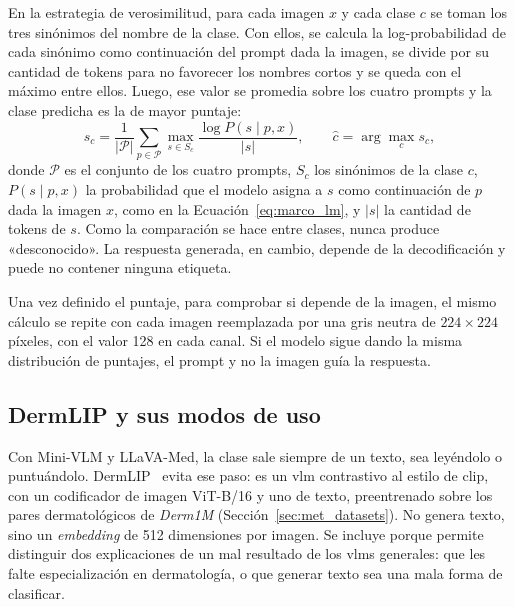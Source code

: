 

En la estrategia de verosimilitud, para cada imagen $x$ y cada clase $c$ se toman los tres sinónimos del nombre de la
clase. Con ellos, se calcula la log-probabilidad de cada sinónimo como continuación del prompt dada la imagen, se
divide por su cantidad de tokens para no favorecer los nombres cortos y se queda con el máximo entre ellos. Luego, ese
valor se promedia sobre los cuatro prompts y la clase predicha es la de mayor puntaje:
\begin{equation}
    s_c = \frac{1}{|\mathcal{P}|} \sum_{p \in \mathcal{P}} \max_{s \in S_c} \frac{\log P(s \mid p, x)}{|s|},
    \qquad \hat{c} = \arg\max_{c} s_c,
    \label{eq:met_likelihood}
\end{equation}
donde $\mathcal{P}$ es el conjunto de los cuatro prompts, $S_c$ los sinónimos de la clase $c$, $P(s \mid p, x)$ la
probabilidad que el modelo asigna a $s$ como continuación de $p$ dada la imagen $x$, como en la
Ecuación~\ref{eq:marco_lm}, y $|s|$ la cantidad de tokens de $s$. Como la comparación se hace entre clases, nunca produce
«desconocido». La respuesta generada, en cambio, depende de la decodificación y puede no contener ninguna etiqueta.

Una vez definido el puntaje, para comprobar si depende de la imagen, el mismo cálculo se repite con cada imagen
reemplazada por una gris neutra de $224 \times 224$ píxeles, con el valor 128 en cada canal. Si el modelo sigue dando la misma distribución de
puntajes, el prompt y no la imagen guía la respuesta.

\subsection{DermLIP y sus modos de uso}
\label{sec:met_dermlip}

Con Mini-VLM y LLaVA-Med, la clase sale siempre de un texto, sea leyéndolo o puntuándolo. DermLIP~\cite{yan2025derm1miccv}
evita ese paso: es un \gls{vlm} contrastivo al estilo de \gls{clip}, con un codificador de imagen ViT-B/16 y uno de
texto, preentrenado sobre los pares dermatológicos de \emph{Derm1M} (Sección~\ref{sec:met_datasets}). No genera texto,
sino un \emph{embedding} de 512 dimensiones por imagen. Se incluye porque permite distinguir dos explicaciones de un mal
resultado de los \glspl{vlm} generales: que les falte especialización en dermatología, o que generar texto sea una mala
forma de clasificar.

